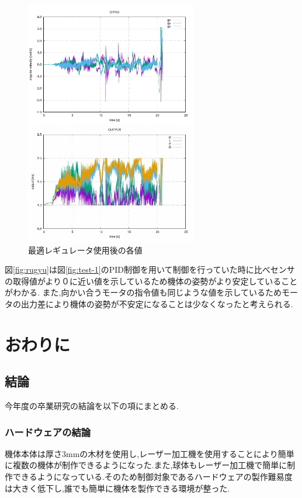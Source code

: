 \documentclass[12pt,oneside]{sotsuken_paper}
\begin{document}
\begin{figure}[htbp]
	\begin{center}
		\includegraphics[width=75mm]{image/regyu.png}
		\caption{最適レギュレータ使用後の各値}
		\label{fig:regyu}
	\end{center}
\end{figure}

図\ref{fig:rugyu}は図\ref{fig:test-1}のPID制御を用いて制御を行っていた時に比べセンサの取得値がより０に近い値を示しているため機体の姿勢がより安定していることがわかる.
また,向かい合うモータの指令値も同じような値を示しているためモータの出力差により機体の姿勢が不安定になることは少なくなったと考えられる.

\chapter{おわりに}

\section{結論}
今年度の卒業研究の結論を以下の項にまとめる.

\subsection{ハードウェアの結論}
機体本体は厚さ3mmの木材を使用し,レーザー加工機を使用することにより簡単に複数の機体が制作できるようになった.また,球体もレーザー加工機で簡単に制作できるようになっている.そのため制御対象であるハードウェアの製作難易度は大きく低下し,誰でも簡単に機体を製作できる環境が整った.
\end{document}
